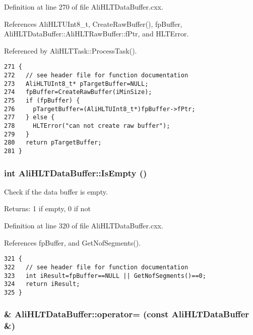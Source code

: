 Definition at line 270 of file Ali\-HLTData\-Buffer.cxx.

References Ali\-HLTUInt8\_\-t, Create\-Raw\-Buffer(), fp\-Buffer, Ali\-HLTData\-Buffer::Ali\-HLTRaw\-Buffer::f\-Ptr, and HLTError.

Referenced by Ali\-HLTTask::Process\-Task().

\footnotesize\begin{verbatim}271 {
272   // see header file for function documentation
273   AliHLTUInt8_t* pTargetBuffer=NULL;
274   fpBuffer=CreateRawBuffer(iMinSize);
275   if (fpBuffer) {
276     pTargetBuffer=(AliHLTUInt8_t*)fpBuffer->fPtr;
277   } else {
278     HLTError("can not create raw buffer");
279   }
280   return pTargetBuffer;
281 }
\end{verbatim}\normalsize 


\subsubsection{\setlength{\rightskip}{0pt plus 5cm}int Ali\-HLTData\-Buffer::Is\-Empty ()}\label{classAliHLTDataBuffer_a10}


Check if the data buffer is empty. \begin{Desc}
\item[Returns:]1 if empty, 0 if not \end{Desc}


Definition at line 320 of file Ali\-HLTData\-Buffer.cxx.

References fp\-Buffer, and Get\-Nof\-Segments().

\footnotesize\begin{verbatim}321 {
322   // see header file for function documentation
323   int iResult=fpBuffer==NULL || GetNofSegments()==0;
324   return iResult;
325 }
\end{verbatim}\normalsize 


\subsubsection{ \& Ali\-HLTData\-Buffer::operator= (const {\bf Ali\-HLTData\-Buffer} \&)}\label{classAliHLTDataBuffer_a2}


